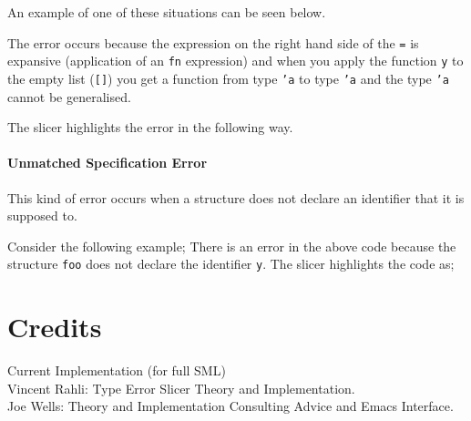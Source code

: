 \documentclass{report}
\begin{document}
\begin{itemize}
An example of one of these situations can be seen below.


The error occurs because the expression on the right hand side of the
\texttt{=} is expansive (application of an \texttt{fn} expression) and when you apply the function
\texttt{y} to the empty list (\texttt{[]}) you get a function
from type \texttt{'a} to type \texttt{'a} and the type
\texttt{'a} cannot be generalised.

The slicer highlights the error in the following way.


\newpage


\subsubsection{Unmatched Specification Error}

\subitem This kind of error occurs when a structure does not declare
an identifier that it is supposed to.

Consider the following example;
There is an error in the above code because the structure
\texttt{foo} does not declare the identifier \texttt{y}.
The slicer highlights the code as;

\end{itemize}

\chapter {Credits}
Current Implementation (for full SML)\\

	Vincent Rahli: Type Error Slicer Theory and Implementation.\\

	Joe Wells: Theory and Implementation Consulting Advice and Emacs
   		   Interface.\\
\end{document}
